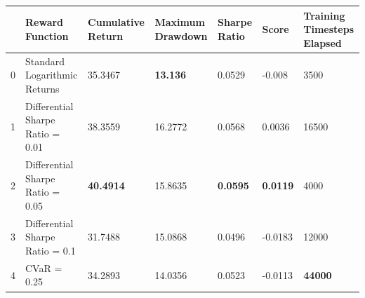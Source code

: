 \begin{tabular}{lllllll}
\toprule
 & Reward Function & Cumulative Return & Maximum Drawdown & Sharpe Ratio & Score & Training Timesteps Elapsed \\
\midrule
0 & Standard Logarithmic Returns & 35.3467 & \textbf{13.136} & 0.0529 & -0.008 & 3500 \\
1 & Differential Sharpe Ratio = 0.01 & 38.3559 & 16.2772 & 0.0568 & 0.0036 & 16500 \\
2 & Differential Sharpe Ratio = 0.05 & \textbf{40.4914} & 15.8635 & \textbf{0.0595} & \textbf{0.0119} & 4000 \\
3 & Differential Sharpe Ratio = 0.1 & 31.7488 & 15.0868 & 0.0496 & -0.0183 & 12000 \\
4 & CVaR = 0.25 & 34.2893 & 14.0356 & 0.0523 & -0.0113 & \textbf{44000} \\
\bottomrule
\end{tabular}
